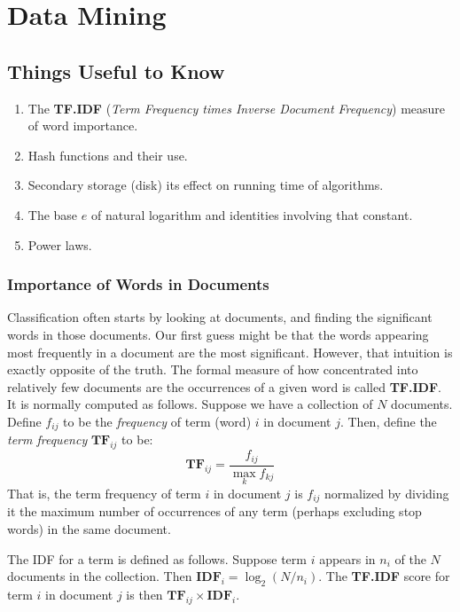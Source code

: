 \chapter{Data Mining}\label{chap:data-mining}

\section{Things Useful to Know}\label{sec:things-useful-to-know}

\begin{enumerate}
    \item The \textbf{TF.IDF} (\textit{Term Frequency times Inverse Document Frequency}) measure of word importance.
    \item Hash functions and their use.
    \item Secondary storage (disk) its effect on running time of algorithms.
    \item The base $e$ of natural logarithm and identities involving that constant.
    \item Power laws.
\end{enumerate}

\subsection{Importance of Words in Documents}\label{subsec:importance-of-words-in-documents}

Classification often starts by looking at documents, and finding the significant words in those documents. Our first guess might be that the words appearing most frequently in a document are the most significant. However, that intuition is exactly opposite of the truth. The formal measure of how concentrated into relatively few documents are the occurrences of a given word is called \textbf{TF.IDF}. It is normally computed as follows. Suppose we have a collection of $N$ documents. Define $f_{ij}$ to be the \textit{frequency} of term (word) $i$ in document $j$. Then, define the \textit{term frequency} $\bm{TF}_{ij}$ to be:
\begin{equation*}\label{eq:tf}
    \bm{TF}_{ij} = \frac{f_{ij}}{\max_{k} f_{kj}}
\end{equation*}
That is, the term frequency of term $i$ in document $j$ is $f_{ij}$ normalized by dividing it the maximum number of occurrences of any term (perhaps excluding stop words) in the same document. 

The IDF for a term is defined as follows. Suppose term $i$ appears in $n_i$ of the $N$ documents in the collection. Then $\bm{IDF}_i = \log_2(N/n_i)$. The \textbf{TF.IDF} score for term $i$ in document $j$ is then $\bm{TF}_{ij} \times \bm{IDF}_i$.


